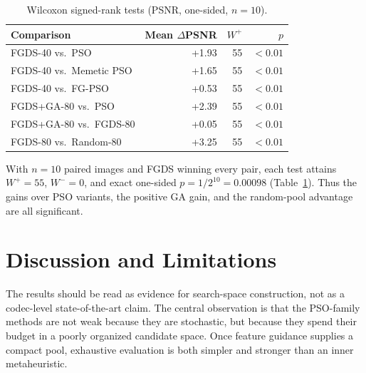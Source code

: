 \documentclass[conference, a4paper]{IEEEtran}
\begin{document}
\begin{table}[H]
    \centering
    \caption{Wilcoxon signed-rank tests (PSNR, one-sided, \mbox{$n=10$}).}
    \label{tab:wilcoxon}
    \small
    \setlength{\tabcolsep}{3pt}
    \begin{tabular}{lrrr}
        \toprule
        \textbf{Comparison}      & \textbf{Mean \mbox{$\Delta$}PSNR} & \mbox{$W^+$} & \mbox{$p$}     \\
        \midrule
        FGDS-40 vs.\ PSO         & +1.93                             & 55           & \mbox{$<0.01$} \\
        FGDS-40 vs.\ Memetic PSO & +1.65                             & 55           & \mbox{$<0.01$} \\
        FGDS-40 vs.\ FG-PSO      & +0.53                             & 55           & \mbox{$<0.01$} \\
        FGDS+GA-80 vs.\ PSO      & +2.39                             & 55           & \mbox{$<0.01$} \\
        FGDS+GA-80 vs.\ FGDS-80  & +0.05                             & 55           & \mbox{$<0.01$} \\
        FGDS-80 vs.\ Random-80   & +3.25                             & 55           & \mbox{$<0.01$} \\
        \bottomrule
    \end{tabular}
\end{table}

With \mbox{$n\!=\!10$} paired images and FGDS winning every pair, each test attains \mbox{$W^+\!=\!55$}, \mbox{$W^-\!=\!0$}, and exact one-sided \mbox{$p=1/2^{10}=0.00098$} (Table~\ref{tab:wilcoxon}). Thus the gains over PSO variants, the positive GA gain, and the random-pool advantage are all significant.

\section{Discussion and Limitations}

The results should be read as evidence for search-space construction, not as a codec-level state-of-the-art claim. The central observation is that the PSO-family methods are not weak because they are stochastic, but because they spend their budget in a poorly organized candidate space. Once feature guidance supplies a compact pool, exhaustive evaluation is both simpler and stronger than an inner metaheuristic.
\end{document}
